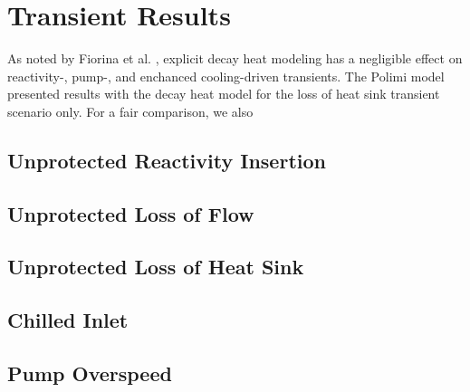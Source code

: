 \section{Transient Results}

As noted by Fiorina et al. \cite{fiorina_modelling_2014}, explicit decay heat
modeling has a negligible effect on reactivity-, pump-, and enchanced
cooling-driven transients. The Polimi model presented results with the decay
heat model for the loss of heat sink transient scenario only. For a fair
comparison, we also 

\subsection{Unprotected Reactivity Insertion}

\subsection{Unprotected Loss of Flow}

\subsection{Unprotected Loss of Heat Sink}

\subsection{Chilled Inlet}

\subsection{Pump Overspeed}
